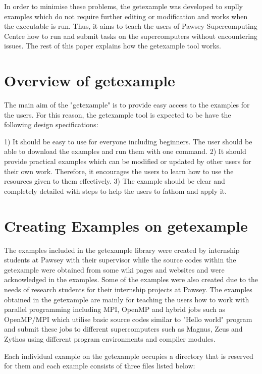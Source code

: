 \documentclass[journal]{IEEEtran}
\begin{document}
In order to minimise these problems, the getexample was developed to suplly examples which do not require further editing or modification and works
when the executable is run. Thus, it aims to teach the users of Pawsey Supercomputing Centre how to run and submit tasks on the supercomputers without 
encountering issues. The rest of this paper explains how the getexample tool works.   

\section{Overview of getexample}

The main aim of the "getexample" is to provide easy access to the examples for the users. For this reason, the getexample tool is expected to be have the 
following design specifications:

1) It should be easy to use for everyone including beginners. The user should be able to download the examples and run them with one command.
2) It should provide practical examples which can be modified or updated by other users for their own work. Therefore, it encourages the users to learn
how to use the resources given to them effectively.
3) The example should be clear and completely detailed with steps to help the users to fathom and apply it.

\section{Creating Examples on getexample}

The examples included in the getexample library were created by internship students at Pawsey with their supervisor while the source codes within the
getexample were obtained from some wiki pages and websites and were acknowledged in the examples. Some of the examples were also created due to the
needs of research students for their internship projects at Pawsey. The examples obtained in the getexample are mainly for teaching the users how to work
with parallel programming including MPI, OpenMP and hybrid jobs such as OpenMP/MPI which utilise basic source codes similar to "Hello world" program and
submit these jobs to different supercomputers such as Magnus, Zeus and Zythos using different program environments and compiler modules. 

Each individual example on the getexample occupies a directory that is reserved for them and each example consists of three files listed below:
    
\end{document}
